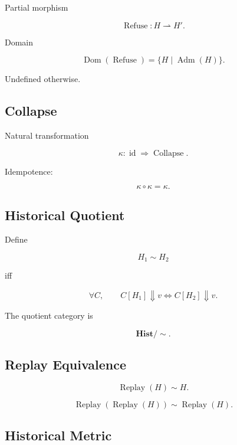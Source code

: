 \documentclass[12pt,oneside]{article}
\theoremstyle{definition}
\theoremstyle{remark}
\begin{document}
Partial morphism

\[
\operatorname{Refuse}
:
H
\rightharpoonup
H'.
\]

Domain

\[
\operatorname{Dom}
(\operatorname{Refuse})
=
\{
H
\mid
\operatorname{Adm}(H)
\}.
\]

Undefined otherwise.

\subsection*{Collapse}

Natural transformation

\[
\kappa
:
\operatorname{id}
\Rightarrow
\operatorname{Collapse}.
\]

Idempotence:

\[
\kappa
\circ
\kappa
=
\kappa.
\]

\subsection*{Historical Quotient}

Define

\[
H_1
\sim
H_2
\]

iff

\[
\forall
C,
\qquad
C[H_1]
\Downarrow
v
\Longleftrightarrow
C[H_2]
\Downarrow
v.
\]

The quotient category is

\[
\mathbf{Hist}/\!\!\sim.
\]

\subsection*{Replay Equivalence}

\[
\operatorname{Replay}(H)
\sim
H.
\]

\[
\operatorname{Replay}
(
\operatorname{Replay}(H)
)
\sim
\operatorname{Replay}(H).
\]

\subsection*{Historical Metric}
\end{document}
